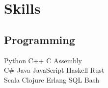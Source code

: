 \documentclass[]{deedy-resume-openfont}
\begin{document}
\begin{minipage}[t]{0.33\textwidth}
\section{Skills}
\subsection{Programming}
Python \textbullet{} C++ \textbullet{} C \textbullet{} Assembly\\
C\# \textbullet{} Java \textbullet{} JavaScript \textbullet{} Haskell \textbullet{} Rust\\
Scala \textbullet{} Clojure \textbullet{} Erlang \textbullet{} SQL \textbullet{} Bash\\
\sectionsep

%
%

\end{minipage} 
\hfill
\end{document}
